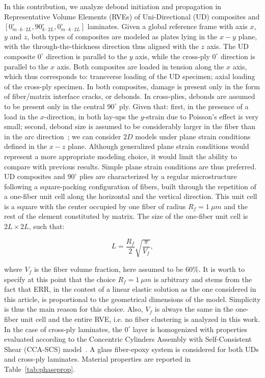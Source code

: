 \documentclass[12pt,a4paper]{article}
\begin{document}
In this contribution, we analyze debond initiation and propagation in Representative Volume Elements (RVEs) of Uni-Directional (UD) composites and $\left[0_{m\cdot k\cdot2L}^{\circ},90_{k\cdot2L}^{\circ},0_{m\cdot k\cdot2L}^{\circ}\right]$ laminates. Given a global reference frame with axis $x$, $y$ and $z$, both types of composites are modeled as plates lying in the $x-y$ plane, with the through-the-thickness direction thus aligned with the $z$ axis. The UD composite $0^{\circ}$ direction is parallel to the $y$ axis, while the cross-ply $0^{\circ}$ direction is parallel to the $x$ axis. Both composites are loaded in tension along the $x$ axis, which thus corresponds to: transverse loading of the UD specimen; axial loading of the cross-ply specimen. In both composites, damage is present only in the form of fiber/matrix interface cracks, or debonds. In cross-plies, debonds are assumed to be present only in the central ${90^{\circ}}$ ply. Given that: first, in the presence of a load in the $x$-direction, in both lay-ups the $y$-strain due to Poisson's effect is very small; second, debond size is assumed to be considerably larger in the fiber than in the arc direction~\cite{Zhang1997}; we can consider $2D$ models under plane strain conditions defined in the $x-z$ plane. Although generalized plane strain conditions would represent a more appropriate modeling choice, it would limit the ability to compare with previous results. Simple plane strain conditions are thus preferred. UD composites and $90^{\circ}$ plies are characterized by a regular microstructure following a square-packing configuration of fibers, built through the repetition of a one-fiber unit cell along the horizontal and the vertical direction. This unit cell is a square with the center occupied by one fiber of radius $R_{f}=1\ \mu m$ and the rest of the element constituted by matrix. The size of the one-fiber unit cell is $2L\times 2L$, such that:

\begin{equation}\label{eq:LVf}
L=\frac{R_{f}}{2}\sqrt{\frac{\pi}{V_{f}}},
\end{equation}

where $V_{f}$ is the fiber volume fraction, here assumed to be $60\%$. It is worth to specify at this point that the choice $R_{f}=1\ \mu m$ is arbitrary and stems from the fact that ERR, in the contest of a linear elastic solution as the one considered in this article, is proportional to the geometrical dimensions of the model. Simplicity is thus the main reason for this choice. Also, $V_{f}$ is always the same in the one-fiber unit cell and the entire RVE, i.e. no fiber clustering is analyzed in this work. In the case of cross-ply laminates, the $0^{\circ}$ layer is homogenized with properties evaluated according to the Concentric Cylinders Assembly with Self-Consistent Shear (CCA-SCS) model~\cite{Hashin1983,Christensen1979}. A glass fiber-epoxy system is considered for both UDs and cross-ply laminates. Material properties are reported in Table~\ref{tab:phaseprop}.
\end{document}
